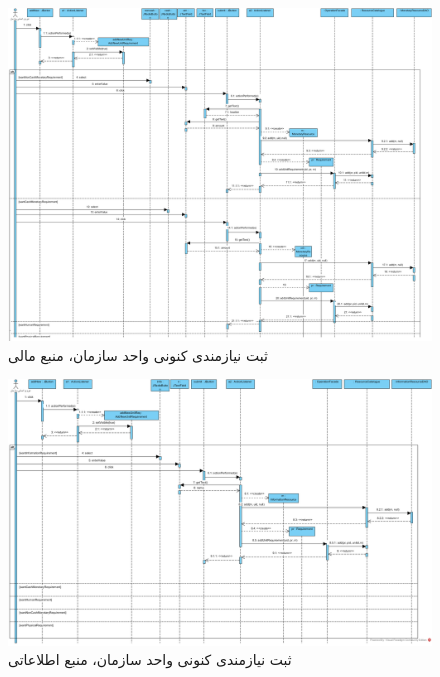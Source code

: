 \begin{landscape}
\begin{figure}[H]
	\includegraphics[scale=0.45]{img/sequence-design/AddRequirementToUnit_MONETARY}
	\caption{ثبت نیازمندی کنونی واحد سازمان، منبع مالی}
\end{figure}
\begin{figure}[H]
	\centering
	\includegraphics[scale=0.5]{img/sequence-design/AddRequirementToUnit_INFORMATION}
	\caption{ثبت نیازمندی کنونی واحد سازمان، منبع اطلاعاتی}
\end{figure}


\end{landscape}
